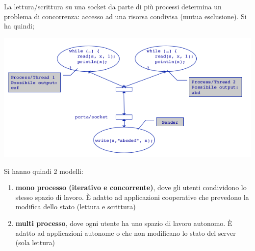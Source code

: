 \message{ !name(sd.tex)}\documentclass[a4paper,12pt, oneside]{book}
\begin{document}
La lettura/scrittura su una socket da parte di più processi
determina un problema di concorrenza: accesso ad una
risorsa condivisa (mutua esclusione). Si ha quindi;
\begin{center}
	\includegraphics[scale=0.7]{img/ex.png}
\end{center}
Si hanno quindi 2 modelli:
\begin{enumerate}
	\item \textbf{mono processo (iterativo e concorrente)}, dove gli utenti condividono lo stesso spazio di lavoro. È adatto ad applicazioni cooperative che prevedono la modifica
	      dello stato (lettura e scrittura)
	\item \textbf{multi processo}, dove ogni utente ha uno spazio di lavoro autonomo. È adatto ad applicazioni autonome o che non modificano lo stato del server (sola lettura)
\end{enumerate}
\end{document}

